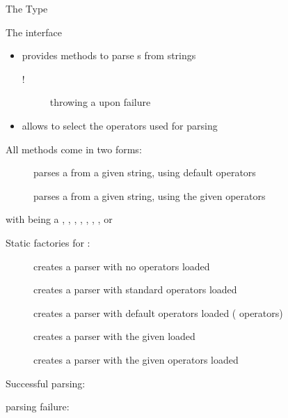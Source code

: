 \documentclass[handout]{beamer}
\begin{document}
\begin{frame}[allowframebreaks]{The  Type}

    \begin{block}{The  interface}
        \begin{itemize}
            \item provides methods to parse s from strings
            \begin{description}
                \item[!] throwing a  upon failure 
            \end{description}
            \item allows to select the operators used for parsing
        \end{itemize}
    \end{block}
    All methods come in two forms:
    \begin{description}
        \item[] parses a  from a given string, using default operators
        \item[] parses a  from a given string, using the given operators
    \end{description}
    with  being a , , , , , , ,  or 

    \framebreak

    Static factories for :
    \begin{description}
        \item [] creates a parser with no operators loaded
        \item [] creates a parser with standard operators loaded
        \item [] creates a parser with default operators loaded ( operators)
        \item [] creates a parser with the given  loaded
        \item [] creates a parser with the given operators loaded 
    \end{description}

    \framebreak

    Successful  parsing:

    \framebreak

     parsing failure:

\end{frame}
\end{document}
